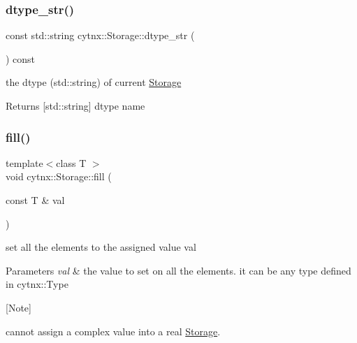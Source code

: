 \subsubsection{\texorpdfstring{dtype\+\_\+str()}{dtype\_str()}}
{\footnotesize\ttfamily const std\+::string cytnx\+::\+Storage\+::dtype\+\_\+str (\begin{DoxyParamCaption}{ }\end{DoxyParamCaption}) const\hspace{0.3cm}{\ttfamily [inline]}}



the dtype (std\+::string) of current \hyperlink{classcytnx_1_1Storage}{Storage} 

\begin{DoxyReturn}{Returns}
\mbox{[}std\+::string\mbox{]} dtype name 
\end{DoxyReturn}
\mbox{\label{classcytnx_1_1Storage_a48f0424f051a4b3a821eb964be4cd5db}} 
\subsubsection{\texorpdfstring{fill()}{fill()}}
{\footnotesize\ttfamily template$<$class T $>$ \\
void cytnx\+::\+Storage\+::fill (\begin{DoxyParamCaption}\item[{const T \&}]{val }\end{DoxyParamCaption})\hspace{0.3cm}{\ttfamily [inline]}}



set all the elements to the assigned value val 


\begin{DoxyParams}{Parameters}
{\em val} & the value to set on all the elements. it can be any type defined in cytnx\+::\+Type\\
\hline
\end{DoxyParams}
\mbox{[}Note\mbox{]}
\begin{DoxyEnumerate}
\item cannot assign a complex value into a real \hyperlink{classcytnx_1_1Storage}{Storage}. 
\end{DoxyEnumerate}\mbox{\label{classcytnx_1_1Storage_a6cf79f362c4ae68ab7623f0ebac9355e}} 
